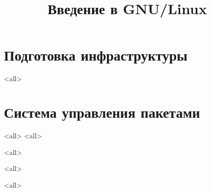 

\title{Введение в GNU/Linux}








\begin{frame}
	\frametitle{}
	\titlepage
	\vspace{-0.5cm}
	\begin{center}
	\end{center}
\end{frame}



\section{Подготовка инфраструктуры}
\mode<all>{}

\section{Система управления пакетами}

\mode<all>{}
\mode<all>{}

\mode<all>{}

\mode<all>{}

\mode<all>
